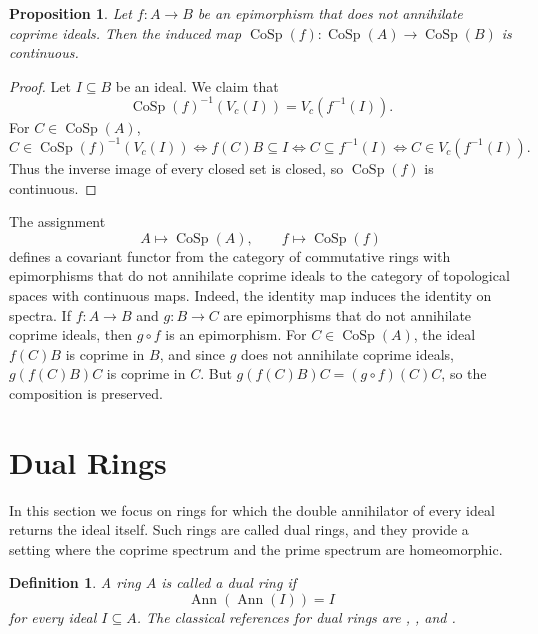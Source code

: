 \documentclass{amsart}
\newtheorem{proposition}{Proposition}
\newtheorem{definition}{Definition}
\DeclareMathOperator{\ann}{Ann}
\begin{document}
\begin{proposition}\label{prop:cosp-continuous}
Let $f\colon A\to B$ be an epimorphism that does not annihilate coprime ideals. Then the induced map $\operatorname{CoSp}(f)\colon \operatorname{CoSp}(A)\to \operatorname{CoSp}(B)$ is continuous.
\end{proposition}

\begin{proof}
Let $I\subseteq B$ be an ideal. We claim that
\[
\operatorname{CoSp}(f)^{-1}(V_c(I))=V_c(f^{-1}(I)).
\]
For $C\in\operatorname{CoSp}(A)$,
\[
C\in \operatorname{CoSp}(f)^{-1}(V_c(I))
\iff f(C)B\subseteq I
\iff C\subseteq f^{-1}(I)
\iff C\in V_c(f^{-1}(I)).
\]
Thus the inverse image of every closed set is closed, so $\operatorname{CoSp}(f)$ is continuous.
\end{proof}

The assignment
\[
A\longmapsto \operatorname{CoSp}(A),\qquad f\longmapsto \operatorname{CoSp}(f)
\]
defines a covariant functor from the category of commutative rings with epimorphisms that do not annihilate coprime ideals to the category of topological spaces with continuous maps. Indeed, the identity map induces the identity on spectra. If $f\colon A\to B$ and $g\colon B\to C$ are epimorphisms that do not annihilate coprime ideals, then $g\circ f$ is an epimorphism. For $C\in\operatorname{CoSp}(A)$, the ideal $f(C)B$ is coprime in $B$, and since $g$ does not annihilate coprime ideals, $g(f(C)B)C$ is coprime in $C$. But $g(f(C)B)C=(g\circ f)(C)C$, so the composition is preserved.

\section{Dual Rings}
\label{sec:dual-rings}

In this section we focus on rings for which the double annihilator of every ideal returns the ideal itself. Such rings are called dual rings, and they provide a setting where the coprime spectrum and the prime spectrum are homeomorphic.

\begin{definition}\label{def:dual-ring}
A ring $A$ is called a \emph{dual ring} if
\[
\ann(\ann(I)) = I
\]
for every ideal $I \subseteq A$. The classical references for dual rings are \cite{hall1939type}, \cite{baer1943rings}, and \cite{kaplansky1948dual}.
\end{definition}
\end{document}
